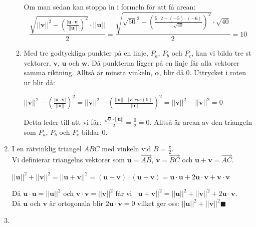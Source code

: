 \documentclass[a4paper]{report}
\begin{document}
\begin{enumerate}
\begin{enumerate}
                Om man sedan kan stoppa in i formeln för att få arean:
                \begin{equation}
                    \frac{\sqrt{||\bm{v}||^{2}-(\frac{|\bm{u}\cdot \bm{v}|}{||\bm{u}||})^{2}}\cdot ||\bm{u}||}{2}=
                    \frac{\sqrt{\sqrt{50}^{2}-(\frac{5\cdot 2 + (-5)\cdot (-6)}{\sqrt{40}})^{2}}\cdot \sqrt{40}}{2}=
                    10
                \end{equation}
            \item 
                Med tre godtyckliga punkter på en linje, $P_{a}$, $P_{b}$ och $P_{c}$, kan vi bilda tre st vektorer, $\bm{v}$, $\bm{u}$ och $\bm{w}$.
                Då punkterna ligger på en linje får alla vektorer samma riktning.
                Alltså är minsta vinkeln, $\alpha$, blir då 0.
                Uttrycket i roten ur blir då: 
                \begin{center}
                    $
                    ||\bm{v}||^{2}-(\frac{|\bm{u}\cdot \bm{v}|}{||\bm{u}||})^{2} = 
                    ||\bm{v}||^{2}-(\frac{||\bm{u}||\cdot||\bm{v}||cos(0)}{||\bm{u}||})^{2}=
                    ||\bm{v}||^{2}-||\bm{v}||^{2}=0
                    $
                \end{center}
                Detta leder till att vi får: $\frac{\sqrt{0}\cdot ||\bm{u}||}{2}=\frac{0}{2}=0$.
                Alltså är arean av den triangeln som $P_{a}$, $P_{b}$ och $P_{c}$ bildar 0.
        \end{enumerate}
    \item
        I en rätvinklig triangel $ABC$ med vinkeln vid $B=\frac{\pi}{2}$.\\
        Vi definierar triangelns vektorer som $\bm{u} = \overrightarrow{AB}$, $\bm{v} = \overrightarrow{BC}$ och $\bm{u}+\bm{v} = \overrightarrow{AC}$.
        \begin{center}
            $||\bm{u}||^{2}+||\bm{v}||^{2}=||\bm{u}+\bm{v}||^{2}=(\bm{u}+\bm{v})\cdot (\bm{u}+\bm{v}) = \bm{u}\cdot \bm{u} + 2\bm{u}\cdot \bm{v}+\bm{v}\cdot \bm{v}$\\
        \end{center}
        Då $\bm{u}\cdot \bm{u}=||\bm{u}||^{2}$ och $\bm{v}\cdot \bm{v}=||\bm{v}||^{2}$ får vi $||\bm{u}+\bm{v}||^{2}=||\bm{u}||^{2}+||\bm{v}||^{2}+2\bm{u}\cdot \bm{v}$.\\
        Då $\bm{u}$ och $\bm{v}$ är ortogonala blir $2\bm{u}\cdot \bm{v} = 0$ vilket ger oss: $||\bm{u}||^{2}+||\bm{v}||^{2} \blacksquare$
    \item 

\end{enumerate}
\end{document}
